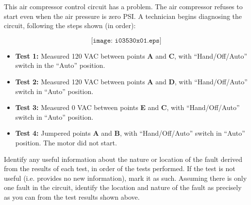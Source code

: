 

This air compressor control circuit has a problem.  The air compressor refuses to start even when the air pressure is zero PSI.  A technician begins diagnosing the circuit, following the steps shown (in order):

$$\texttt{[image: i03530x01.eps]}$$

\begin{itemize}
\item{} {\bf Test 1:} Measured 120 VAC between points {\bf A} and {\bf C}, with ``Hand/Off/Auto'' switch in the ``Auto'' position.
\vskip 25pt
\item{} {\bf Test 2:} Measured 120 VAC between points {\bf A} and {\bf D}, with ``Hand/Off/Auto'' switch in ``Auto'' position.
\vskip 25pt
\item{} {\bf Test 3:} Measured 0 VAC between points {\bf E} and {\bf C}, with ``Hand/Off/Auto'' switch in ``Auto'' position.
\vskip 25pt
\item{} {\bf Test 4:} Jumpered points {\bf A} and {\bf B}, with ``Hand/Off/Auto'' switch in ``Auto'' position.  The motor did not start.
\vskip 25pt
\end{itemize}

Identify any useful information about the nature or location of the fault derived from the results of each test, in order of the tests performed.  If the test is not useful (i.e. provides no new information), mark it as such.  Assuming there is only one fault in the circuit, identify the location and nature of the fault as precisely as you can from the test results shown above.

\vfil 

\eject






